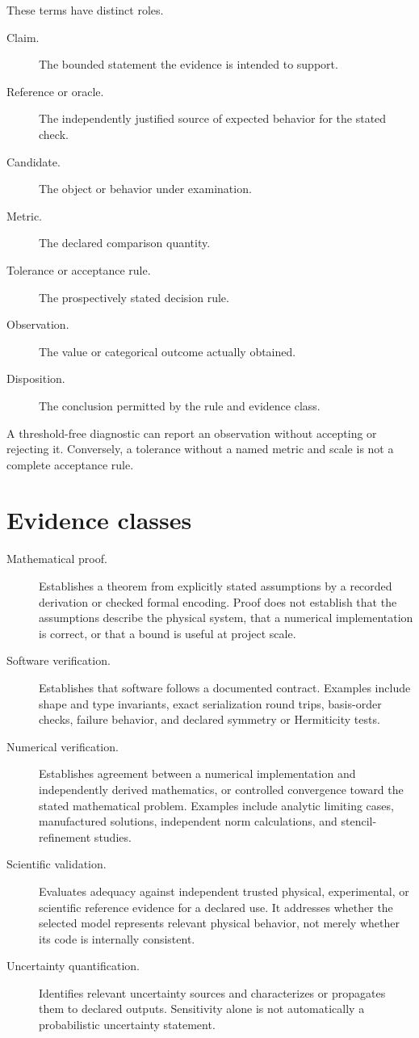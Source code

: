 These terms have distinct roles.

\begin{description}
  \item[Claim.] The bounded statement the evidence is intended to support.
  \item[Reference or oracle.] The independently justified source of expected
        behavior for the stated check.
  \item[Candidate.] The object or behavior under examination.
  \item[Metric.] The declared comparison quantity.
  \item[Tolerance or acceptance rule.] The prospectively stated decision rule.
  \item[Observation.] The value or categorical outcome actually obtained.
  \item[Disposition.] The conclusion permitted by the rule and evidence class.
\end{description}

A threshold-free diagnostic can report an observation without accepting or
rejecting it. Conversely, a tolerance without a named metric and scale is not a
complete acceptance rule.

\section{Evidence classes}

\begin{description}
  \item[Mathematical proof.] Establishes a theorem from explicitly stated
    assumptions by a recorded derivation or checked formal encoding. Proof does
    not establish that the assumptions describe the physical system, that a
    numerical implementation is correct, or that a bound is useful at project
    scale.
  \item[Software verification.] Establishes that software follows a documented
    contract. Examples include shape and type invariants, exact serialization
    round trips, basis-order checks, failure behavior, and declared symmetry or
    Hermiticity tests.
  \item[Numerical verification.] Establishes agreement between a numerical
    implementation and independently derived mathematics, or controlled
    convergence toward the stated mathematical problem. Examples include
    analytic limiting cases, manufactured solutions, independent norm
    calculations, and stencil-refinement studies.
  \item[Scientific validation.] Evaluates adequacy against independent trusted
    physical, experimental, or scientific reference evidence for a declared
    use. It addresses whether the selected model represents relevant physical
    behavior, not merely whether its code is internally consistent.
  \item[Uncertainty quantification.] Identifies relevant uncertainty sources and
    characterizes or propagates them to declared outputs. Sensitivity alone is
    not automatically a probabilistic uncertainty statement.
\end{description}

